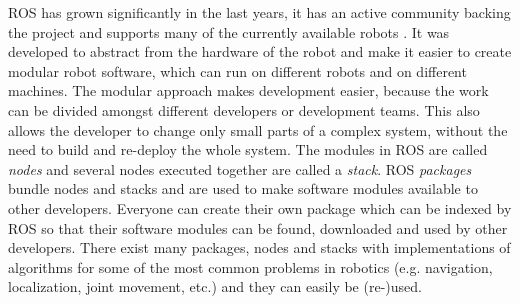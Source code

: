 \begin{figure}[ht]
\centering
{}
\end{figure}

ROS has grown significantly in the last years, it has an active community backing the project and supports many of the currently available robots \cite{Foote2012}. It was developed to abstract from the hardware of the robot and make it easier to create modular robot software, which can run on different robots and on different machines. The modular approach makes development easier, because the work can be divided amongst different developers or development teams. This also allows the developer to change only small parts of a complex system, without the need to build and re-deploy the whole system.
The modules in ROS are called \emph{nodes} and several nodes executed together are called a \emph{stack}. ROS \emph{packages} bundle nodes and stacks and are used to make software modules available to other developers. Everyone can create their own package which can be indexed by ROS so that their software modules can be found, downloaded and used by other developers. There exist many packages, nodes and stacks with implementations of algorithms for some of the most common problems in robotics (e.g. navigation, localization, joint movement, etc.) and they can easily be (re-)used.

